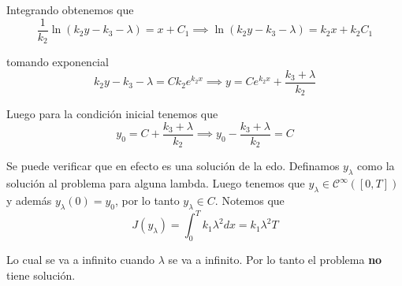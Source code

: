 \documentclass[a4paper,oneside,10.5pt]{USMArt}
\begin{document}
\begin{sol}
\begin{enumerate}
        Integrando obtenemos que
        \begin{equation*}
          \frac{1}{k_{2}} \ln(k_{2}y - k_{3} - \lambda) = x + C_{1} \implies \ln(k_{2}y - k_{3} - \lambda) = k_{2}x + k_{2}C_{1}
        \end{equation*}

        tomando exponencial
        \begin{equation*}
          k_{2}y - k_{3} - \lambda = Ck_{2}e^{k_{2}x} \implies y = Ce^{k_{2}x} + \frac{k_{3} + \lambda}{k_{2}}
        \end{equation*}

        Luego para la condición inicial tenemos que
        \begin{equation*}
          y_{0} = C + \frac{k_{3} + \lambda}{k_{2}} \implies y_{0} - \frac{k_{3} + \lambda}{k_{2}} = C
        \end{equation*}

        Se puede verificar que en efecto es una solución de la edo. Definamos $y_{\lambda}$ como la solución al
        problema para alguna lambda. Luego tenemos que $y_{\lambda} \in \mathcal{C}^{\infty}([0, T])$ y
        además $y_{\lambda}(0) = y_{0}$, por lo tanto $y_{\lambda} \in C$. Notemos que
        \begin{equation*}
          J(y_{\lambda}) = \int_{0}^{T} k_{1}\lambda^{2} dx = k_{1} \lambda^{2} T
        \end{equation*}

        Lo cual se va a infinito cuando $\lambda$ se va a infinito. Por lo tanto el problema \textbf{no} tiene solución.
\end{enumerate}
\end{sol}
\end{document}
